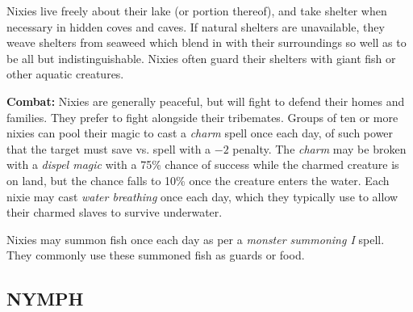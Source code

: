 \begin{multicols}{2}
Nixies live freely about their lake (or portion thereof), and take shelter when necessary in hidden coves and caves. If natural shelters are unavailable, they weave shelters from seaweed which blend in with their surroundings so well as to be all but indistinguishable. Nixies often guard their shelters with giant fish or other aquatic creatures.

\textbf{Combat:} Nixies are generally peaceful, but will fight to defend their homes and families. They prefer to fight alongside their tribemates. Groups of ten or more nixies can pool their magic to cast a \textit{charm} spell once each day, of such power that the target must save vs. spell with a $-2$ penalty. The \textit{charm} may be broken with a \textit{dispel magic} with a 75\% chance of success while the charmed creature is on land, but the chance falls to 10\% once the creature enters the water. Each nixie may cast \textit{water breathing} once each day, which they typically use to allow their charmed slaves to survive underwater.

Nixies may summon fish once each day as per a \textit{monster summoning I} spell. They commonly use these summoned fish as guards or food.

\noindent
\begin{minipage}{\columnwidth}

\vspace{1em}

\subsection{NYMPH}


\end{minipage}
\end{multicols}
